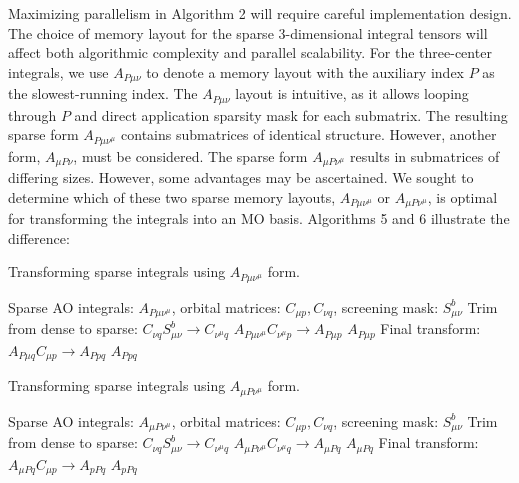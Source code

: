Maximizing parallelism in Algorithm 2 will require careful implementation design. 
The choice of memory layout for the sparse 3-dimensional integral tensors will affect both algorithmic 
complexity and parallel scalability. For the three-center integrals, we use $A_{P\mu \nu}$ to denote a memory 
layout with the auxiliary index $P$ as the slowest-running index. 
The $A_{P \mu \nu}$ layout is intuitive, as it allows looping through $P$ and direct application sparsity mask 
for each submatrix. The resulting sparse form $A_{P \mu \nu^\mu}$ contains submatrices of identical structure.
However, another form, $A_{\mu P \nu}$, must be considered. The sparse form $A_{\mu P \nu^\mu}$
results in submatrices of differing sizes. However, some advantages may be ascertained.
We sought to determine which of these two sparse memory layouts, $A_{P \mu \nu^\mu}$ or 
$A_{\mu P \nu^\mu}$, is optimal for transforming the integrals into an MO basis.
Algorithms 5 and 6 illustrate the difference:

\begin{algorithm}[H]
\caption{Transforming sparse integrals using $A_{P \mu \nu^\mu}$ form.}
\begin{algorithmic}
\REQUIRE Sparse AO integrals: $A_{P \mu \nu^\mu}$, orbital matrices: $C_{\mu p}, C_{\nu q}$, screening mask: $S_{\mu \nu}^b$
        \STATE Trim from dense to sparse: $C_{\nu q}S_{\mu \nu}^b \rightarrow C_{\nu^{\mu} q}$
        \STATE $A_{P \mu \nu^\mu} C_{\nu^{\mu} p} \rightarrow A_{P \mu p}$
    \ENDFOR
\ENDFOR
\RETURN $A_{P \mu p}$
\STATE Final transform: $A_{P \mu q}C_{\mu p} \rightarrow A_{P p q}$
\RETURN $A_{P p q}$
\end{algorithmic}
\end{algorithm}

\begin{algorithm}[H]
\caption{Transforming sparse integrals using $A_{\mu P \nu^\mu}$ form.}
\begin{algorithmic}
\REQUIRE Sparse AO integrals: $A_{\mu P \nu^\mu}$, orbital matrices: $C_{\mu p}, C_{\nu q}$, screening mask: $S_{\mu \nu}^b$
    \STATE Trim from dense to sparse: $C_{\nu q}S_{\mu \nu}^b \rightarrow C_{\nu^{\mu} q}$
    \STATE $A_{\mu P \nu^{\mu}} C_{\nu^{\mu} q} \rightarrow A_{\mu Pq}$
\ENDFOR
\RETURN $A_{\mu P q}$
\STATE Final transform: $A_{\mu P q}C_{\mu p} \rightarrow A_{p P q}$
\RETURN $A_{p P q}$
\end{algorithmic}
\end{algorithm}


